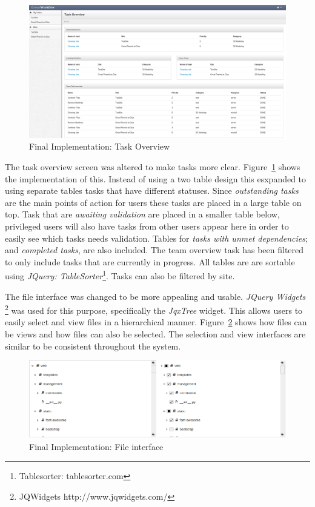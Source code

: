 \documentclass[12pt,a4paper]{report}
\begin{document}
\begin{figure}[!h]
    \begin{center}
        \includegraphics[scale=0.22]{figures/final-overview.png}
    \end{center}
    \caption{Final Implementation: Task Overview}
    \label{final:overview}
\end{figure}

The task overview screen was altered to make tasks more clear. Figure~\ref{final:overview}
shows the implementation of this. Instead of using a two table design this  esxpanded to
using separate tables tasks that have different statuses. Since \emph{outstanding tasks}
are the main points of action for users these tasks are placed in a large table on top.
Task that are \emph{awaiting validation} are placed in a smaller table below, privileged
users will also have tasks from other users appear here in order to easily see which tasks
needs validation. Tables for \emph{tasks with unmet dependencies}; and
\emph{completed tasks}, are also included. The team overview task has been filtered
to only include tasks that are currently in progress. All tables are are sortable
using \emph{JQuery: TableSorter}\footnote{Tablesorter: tablesorter.com}. Tasks can
also be filtered by site.

The file interface was changed to be more appealing and usable. \emph{JQuery Widgets}
\footnote{JQWidgets http://www.jqwidgets.com/} was used for this purpose, specifically
the \emph{JqxTree} widget. This allows users to easily select and view files in a hierarchical
manner. Figure~\ref{final:tree_view} shows how files can be views and how files can also be
selected. The selection and view interfaces are similar to be consistent throughout the system.

\begin{figure}[!h]
    \begin{center}
        \includegraphics[scale=0.45]{figures/final-interface.png}
    \end{center}
    \caption{Final Implementation: File interface}
    \label{final:tree_view}
\end{figure}
\end{document}

